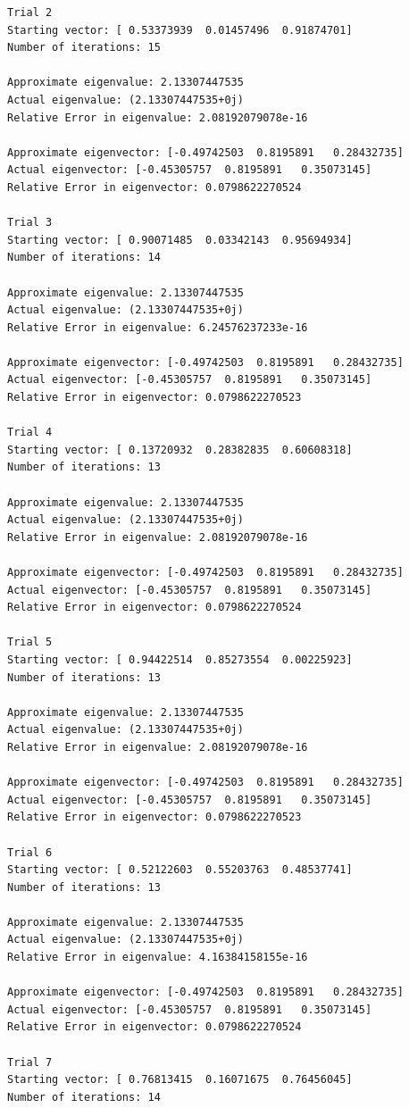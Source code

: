 \documentclass[10pt]{article}
\begin{document}
\begin{itemize}
\begin{verbatim}
Trial 2
Starting vector: [ 0.53373939  0.01457496  0.91874701]
Number of iterations: 15

Approximate eigenvalue: 2.13307447535
Actual eigenvalue: (2.13307447535+0j)
Relative Error in eigenvalue: 2.08192079078e-16

Approximate eigenvector: [-0.49742503  0.8195891   0.28432735]
Actual eigenvector: [-0.45305757  0.8195891   0.35073145]
Relative Error in eigenvector: 0.0798622270524

Trial 3
Starting vector: [ 0.90071485  0.03342143  0.95694934]
Number of iterations: 14

Approximate eigenvalue: 2.13307447535
Actual eigenvalue: (2.13307447535+0j)
Relative Error in eigenvalue: 6.24576237233e-16

Approximate eigenvector: [-0.49742503  0.8195891   0.28432735]
Actual eigenvector: [-0.45305757  0.8195891   0.35073145]
Relative Error in eigenvector: 0.0798622270523

Trial 4
Starting vector: [ 0.13720932  0.28382835  0.60608318]
Number of iterations: 13

Approximate eigenvalue: 2.13307447535
Actual eigenvalue: (2.13307447535+0j)
Relative Error in eigenvalue: 2.08192079078e-16

Approximate eigenvector: [-0.49742503  0.8195891   0.28432735]
Actual eigenvector: [-0.45305757  0.8195891   0.35073145]
Relative Error in eigenvector: 0.0798622270524

Trial 5
Starting vector: [ 0.94422514  0.85273554  0.00225923]
Number of iterations: 13

Approximate eigenvalue: 2.13307447535
Actual eigenvalue: (2.13307447535+0j)
Relative Error in eigenvalue: 2.08192079078e-16

Approximate eigenvector: [-0.49742503  0.8195891   0.28432735]
Actual eigenvector: [-0.45305757  0.8195891   0.35073145]
Relative Error in eigenvector: 0.0798622270523

Trial 6
Starting vector: [ 0.52122603  0.55203763  0.48537741]
Number of iterations: 13

Approximate eigenvalue: 2.13307447535
Actual eigenvalue: (2.13307447535+0j)
Relative Error in eigenvalue: 4.16384158155e-16

Approximate eigenvector: [-0.49742503  0.8195891   0.28432735]
Actual eigenvector: [-0.45305757  0.8195891   0.35073145]
Relative Error in eigenvector: 0.0798622270524

Trial 7
Starting vector: [ 0.76813415  0.16071675  0.76456045]
Number of iterations: 14


\end{verbatim}
\end{itemize}
\end{document}
